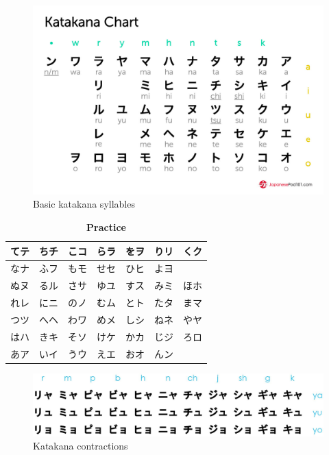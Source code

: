 \documentclass{proc}
\newcommand{\tab}[3][|r|l|]{
    {   %
        \begin{table}[H] %
        \caption*{\textbf{#2}}
        \vspace{-0.3cm} %
        \centering
        \begin{tabular}{#1}%
        \hline
        #3
        \end{tabular}
        \end{table}
    }
}
\newcommand{\kana}[1]{%
    \begin{CJK}{UTF8}{goth}%
    #1%
    \end{CJK}%
}
\begin{document}
{\begin{figure}
    \vspace{-3cm}  %
    \includegraphics[scale=0.25]{res/katakana_chart.jpg}
    \caption{Basic katakana syllables}
\end{figure}

\tab[|c|c|c|c|c|c|c|]{Practice}{
てテ & ちチ & こコ & らラ & をヲ & りリ & くク    \\\hline
なナ & ふフ & もモ & せセ & ひヒ & よヨ &     \\\hline
ぬヌ & るル & さサ & ゆユ & すス & みミ & ほホ    \\\hline
れレ & にニ & のノ & むム & とト & たタ & まマ    \\\hline
つツ & へヘ & わワ & めメ & しシ & ねネ & やヤ    \\\hline
はハ & きキ & そソ & けケ & かカ & じジ & ろロ    \\\hline
あア & いイ & うウ & えエ & おオ & んン &     \\\hline
}


\begin{figure}[!ht]
    \includegraphics[scale=0.4]{res/katakana_diagraphs.jpg}
    \caption{Katakana contractions}
\end{figure}

} %
\end{document}
